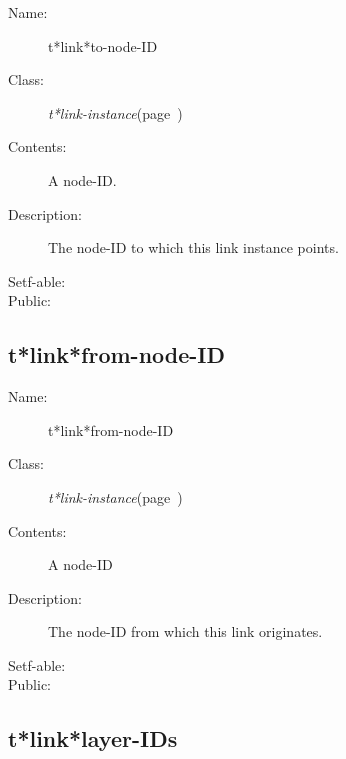 \begin{description}
\item [Name:]  t*link*to-node-ID

\item [Class:] {\sl t*link-instance}\hfill(page~\pageref{t*link-instance})

\item [Contents:]
A node-ID.

\item [Description:]

The node-ID to which this link instance points. 

\item [Setf-able:]


\item [Public:]



\end{description}
\horizontalline

\subsection{t*link*from-node-ID}
\label{t*link*from-node-ID}

\begin{description}
\item [Name:]  t*link*from-node-ID

\item [Class:] {\sl t*link-instance}\hfill(page~\pageref{t*link-instance})

\item [Contents:] 
A node-ID

\item [Description:]

The node-ID from which this link originates.

\item [Setf-able:]


\item [Public:]



\end{description}
\horizontalline

\subsection{t*link*layer-IDs}
\label{t*link*layer-IDs}


